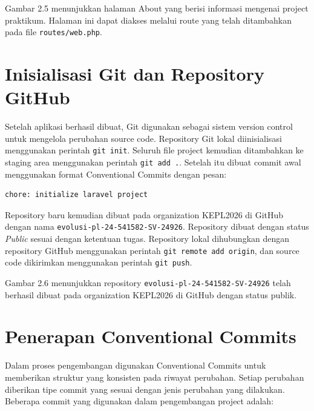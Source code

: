 \documentclass[a4paper,oneside,11pt]{book}
\begin{document}

Gambar 2.5 menunjukkan halaman About yang berisi informasi mengenai project praktikum. Halaman ini dapat diakses melalui route yang telah ditambahkan pada file \texttt{routes/web.php}.

\section{Inisialisasi Git dan Repository GitHub}

Setelah aplikasi berhasil dibuat, Git digunakan sebagai sistem version control untuk mengelola perubahan source code. Repository Git lokal diinisialisasi menggunakan perintah \texttt{git init}. Seluruh file project kemudian ditambahkan ke staging area menggunakan perintah \texttt{git add .}. Setelah itu dibuat commit awal menggunakan format Conventional Commits dengan pesan:

\begin{lstlisting}
chore: initialize laravel project
\end{lstlisting}

Repository baru kemudian dibuat pada organization KEPL2026 di GitHub dengan nama \texttt{evolusi-pl-24-541582-SV-24926}. Repository dibuat dengan status \textit{Public} sesuai dengan ketentuan tugas. Repository lokal dihubungkan dengan repository GitHub menggunakan perintah \texttt{git remote add origin}, dan source code dikirimkan menggunakan perintah \texttt{git push}.


Gambar 2.6 menunjukkan repository \texttt{evolusi-pl-24-541582-SV-24926} telah berhasil dibuat pada organization KEPL2026 di GitHub dengan status publik.

\section{Penerapan Conventional Commits}

Dalam proses pengembangan digunakan Conventional Commits untuk memberikan struktur yang konsisten pada riwayat perubahan. Setiap perubahan diberikan tipe commit yang sesuai dengan jenis perubahan yang dilakukan. Beberapa commit yang digunakan dalam pengembangan project adalah:
\end{document}
